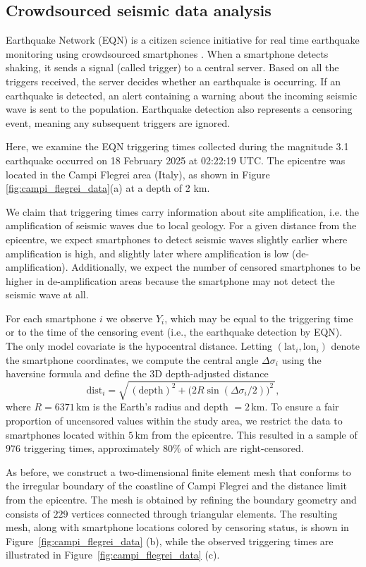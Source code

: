 \documentclass[11pt]{article}
\begin{document}
\FloatBarrier
\subsection{Crowdsourced seismic data analysis}\label{sec:earthquake}  
Earthquake Network (EQN) is a citizen science initiative for real time earthquake monitoring using crowdsourced smartphones \citep{finazzi2016}. When a smartphone detects shaking, it sends a signal (called trigger) to a central server. Based on all the triggers received, the server decides whether an earthquake is occurring. If an earthquake is detected, an alert containing a warning about the incoming seismic wave is sent to the population.
Earthquake detection also represents a censoring event, meaning any subsequent triggers are ignored.

Here, we examine the EQN triggering times collected during the magnitude 3.1 earthquake occurred on 18 February 2025 at 02:22:19 UTC. The epicentre was located in the Campi Flegrei area (Italy), as shown in Figure \ref{fig:campi_flegrei_data}(a) at a depth of 2 km. 

We claim that triggering times carry information about site amplification, i.e. the amplification of seismic waves due to local geology. For a given distance from the epicentre, we expect smartphones to detect seismic waves slightly earlier where amplification is high, and slightly later where amplification is low (de-amplification). Additionally, we expect the number of censored smartphones to be higher in de-amplification areas because the smartphone may not detect the seismic wave at all.

For each smartphone \(i\) we observe \(Y_i\), which may be equal to the triggering time or to the time of the censoring event (i.e., the earthquake detection by EQN). The only model covariate is the hypocentral distance. Letting \((\text{lat}_i,\text{lon}_i)\) denote the smartphone coordinates, we compute the central angle \(\Delta\sigma_i\) using the haversine formula and define the 3D depth-adjusted distance
\[
\text{dist}_i = \sqrt{\,(\text{depth})^2 + \big(2R\sin(\Delta\sigma_i/2)\big)^2\,},
\]
where \(R=6371\,\text{km}\) is the Earth’s radius and depth \(=2\,\text{km}\). To ensure a fair proportion of uncensored values within the study area, we restrict the data to smartphones located within \(5\,\text{km}\) from the epicentre. This resulted in a sample of \(976\) triggering times, approximately \(80\%\) of which are right-censored.

As before, we construct a two-dimensional finite element mesh that conforms to the irregular boundary of the coastline of Campi Flegrei and the distance limit from the epicentre. The mesh is obtained by refining the boundary geometry and consists of $229$ vertices connected through triangular elements. The resulting mesh, along with smartphone locations colored by censoring status, is shown in Figure~\ref{fig:campi_flegrei_data} (b), while the observed triggering times are illustrated in Figure~\ref{fig:campi_flegrei_data} (c).
\end{document}
